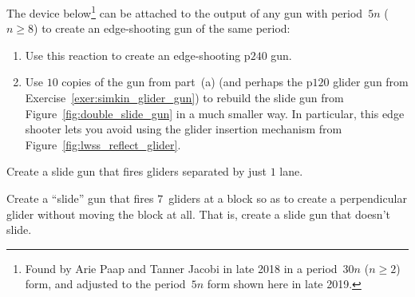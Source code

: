 \begin{multicols}{2}
	
	\mfilbreak
	
	
	\begin{problem}\label{exer:edge_shoot_30n}
		The device below\footnote{Found by Arie Paap and Tanner Jacobi in late 2018 in a period~$30n$ ($n \geq 2$) form, and adjusted to the period~$5n$ form shown here in late 2019.} can be attached to the output of any gun with period~$5n$ ($n \geq 8$) to create an edge-shooting gun of the same period:
		\begin{center}
		\end{center}
		
		\begin{enumerate}[label=\bf\color{ocre}(\alph*)]
			\item {} Use this reaction to create an edge-shooting p$240$ gun.
			
			\item {} Use $10$ copies of the gun from part~(a) (and perhaps the p$120$ glider gun from Exercise~\ref{exer:simkin_glider_gun}) to rebuild the slide gun from Figure~\ref{fig:double_slide_gun} in a much smaller way. In particular, this edge shooter lets you avoid using the glider insertion mechanism from Figure~\ref{fig:lwss_reflect_glider}.
		\end{enumerate}
	\end{problem}
	
	
	\mfilbreak
	
	
	\begin{problem}\label{exer:slide_gun_hd} 
		Create a slide gun that fires gliders separated by just $1$ lane.
		
	\end{problem}
	
	
	\mfilbreak
	
	
	\begin{problem}\label{exer:slide_gun_no_slide} 
		Create a ``slide'' gun that fires $7$~gliders at a block so as to create a perpendicular glider without moving the block at all. That is, create a slide gun that doesn't slide.
	\end{problem}
	

\end{multicols}
